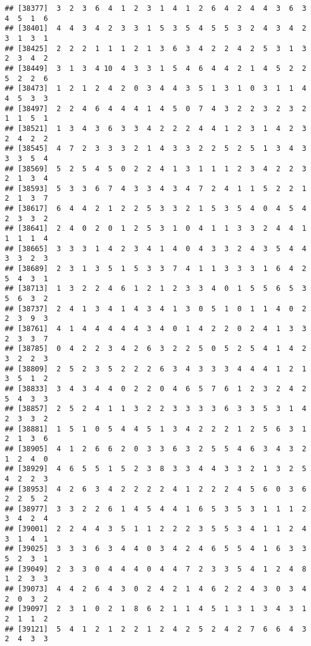 \documentclass[
]{article}
\begin{document}
\begin{verbatim}
## [38377]  3  2  3  6  4  1  2  3  1  4  1  2  6  4  2  4  4  3  6  3  4  5  1  6
## [38401]  4  4  3  4  2  3  3  1  5  3  5  4  5  5  3  2  4  3  4  2  3  1  3  1
## [38425]  2  2  2  1  1  1  2  1  3  6  3  4  2  2  4  2  5  3  1  3  2  3  4  2
## [38449]  3  1  3  4 10  4  3  3  1  5  4  6  4  4  2  1  4  5  2  2  5  2  2  6
## [38473]  1  2  1  2  4  2  0  3  4  4  3  5  1  3  1  0  3  1  1  4  4  5  3  3
## [38497]  2  2  4  6  4  4  4  1  4  5  0  7  4  3  2  2  3  2  3  2  1  1  5  1
## [38521]  1  3  4  3  6  3  3  4  2  2  2  4  4  1  2  3  1  4  2  3  2  4  2  2
## [38545]  4  7  2  3  3  3  2  1  4  3  3  2  2  5  2  5  1  3  4  3  3  3  5  4
## [38569]  5  2  5  4  5  0  2  2  4  1  3  1  1  1  2  3  4  2  2  3  2  1  3  4
## [38593]  5  3  3  6  7  4  3  3  4  3  4  7  2  4  1  1  5  2  2  1  2  1  3  7
## [38617]  6  4  4  2  1  2  2  5  3  3  2  1  5  3  5  4  0  4  5  4  2  3  3  2
## [38641]  2  4  0  2  0  1  2  5  3  1  0  4  1  1  3  3  2  4  4  1  1  1  1  4
## [38665]  3  3  3  1  4  2  3  4  1  4  0  4  3  3  2  4  3  5  4  4  3  3  2  3
## [38689]  2  3  1  3  5  1  5  3  3  7  4  1  1  3  3  3  1  6  4  2  5  4  3  1
## [38713]  1  3  2  2  4  6  1  2  1  2  3  3  4  0  1  5  5  6  5  3  5  6  3  2
## [38737]  2  4  1  3  4  1  4  3  4  1  3  0  5  1  0  1  1  4  0  2  2  3  9  3
## [38761]  4  1  4  4  4  4  4  3  4  0  1  4  2  2  0  2  4  1  3  3  2  3  3  7
## [38785]  0  4  2  2  3  4  2  6  3  2  2  5  0  5  2  5  4  1  4  2  3  2  2  3
## [38809]  2  5  2  3  5  2  2  2  6  3  4  3  3  3  4  4  4  1  2  1  3  5  1  2
## [38833]  3  4  3  4  4  0  2  2  0  4  6  5  7  6  1  2  3  2  4  2  5  4  3  3
## [38857]  2  5  2  4  1  1  3  2  2  3  3  3  3  6  3  3  5  3  1  4  2  3  3  2
## [38881]  1  5  1  0  5  4  4  5  1  3  4  2  2  2  1  2  5  6  3  1  2  1  3  6
## [38905]  4  1  2  6  6  2  0  3  3  6  3  2  5  5  4  6  3  4  3  2  1  2  4  0
## [38929]  4  6  5  5  1  5  2  3  8  3  3  4  4  3  3  2  1  3  2  5  4  2  2  3
## [38953]  4  2  6  3  4  2  2  2  2  4  1  2  2  2  4  5  6  0  3  6  2  2  5  2
## [38977]  3  3  2  2  6  1  4  5  4  4  1  6  5  3  5  3  1  1  1  2  3  4  2  4
## [39001]  2  2  4  4  3  5  1  1  2  2  2  3  5  5  3  4  1  1  2  4  3  1  4  1
## [39025]  3  3  3  6  3  4  4  0  3  4  2  4  6  5  5  4  1  6  3  3  5  2  3  1
## [39049]  2  3  3  0  4  4  4  0  4  4  7  2  3  3  5  4  1  2  4  8  1  2  3  3
## [39073]  4  4  2  6  4  3  0  2  4  2  1  4  6  2  2  4  3  0  3  4  2  0  3  2
## [39097]  2  3  1  0  2  1  8  6  2  1  1  4  5  1  3  1  3  4  3  1  2  1  1  2
## [39121]  5  4  1  2  1  2  2  1  2  4  2  5  2  4  2  7  6  6  4  3  2  4  3  3

\end{verbatim}
\end{document}
